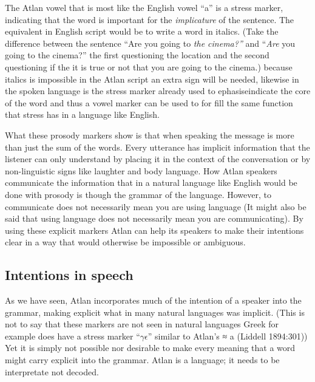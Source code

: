\noindent The Atlan vowel that is most like the English vowel “a” is a stress marker, indicating that the word is important for the \textit{implicature} of the sentence. The equivalent in English script would be to write a word in italics. (Take the difference between the sentence “Are you going to \textit{the cinema?”} and “\textit{Are} you going to the cinema?” the first questioning the location and the second questioning if the it is true or not that you are going to the cinema.) because italics is impossible in the Atlan script an extra sign will be needed, likewise in the spoken language is the stress marker already used to ephasiseindicate the core of the word and thus a vowel marker can be used to for fill the same function that stress has in a language like English.  

What these prosody markers show is that when speaking the message is more than just the sum of the words. Every utterance has implicit information that the listener can only understand by placing it in the context of the conversation or by non-linguistic signs like laughter and body language. How Atlan speakers communicate the information that in a natural language like English would be done with prosody is though the grammar of the language. However, to communicate does not necessarily mean you are using language (It might also be said that using language does not necessarily mean you are communicating). By using these explicit markers Atlan can help its speakers to make their intentions clear in a way that would otherwise be impossible or ambiguous. 

\subsection{Intentions in speech}

As we have seen, Atlan incorporates much of the intention of a speaker into the grammar, making explicit what in many natural languages was implicit. (This is not to say that these markers are not seen in natural languages Greek for example does have a stress marker “$\gamma\epsilon$” similar to Atlan’s \Atlana ≈ a (Liddell 1894:301)) Yet it is simply not possible nor desirable to make every meaning that a word might carry explicit into the grammar. Atlan is a language; it needs to be interpretate not decoded.

